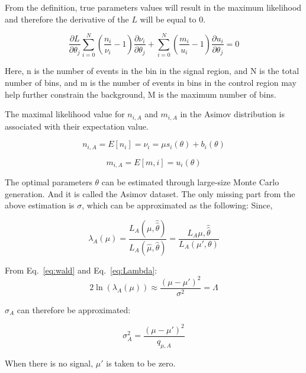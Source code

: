 From the definition, true parameters values will result in the maximum likelihood and therefore the derivative of the ${L}$ will be equal to 0. 

\begin{equation}
\frac{\partial{L}}{\partial{\theta_{j}}} \sum_{i=0}^{N}(\frac{n_{i}}{\nu_{i}}-1) \frac{\partial{\nu_{i}}}{\partial{\theta_{j}}}+ \sum_{i=0}^{N}(\frac{m_{i}}{u_{i}}-1) \frac{\partial{u_{i}}}{\partial{\theta_{j}}} =  0 
\end{equation}

Here, n is the number of events in the bin in the signal region, and N is the total number of bins, and m is the number of events in bins in the control region may help further constrain the background, M is the maximum number of bins. 

The maximal likelihood value for $n_{i,A}$ and $m_{i,A}$ in the Asimov distribution is associated with their expectation value. 

\begin{equation}
    n_{i,A} = E[n_{i}] = \nu_{i} = \mu s_{i}(\theta) + b_{i}(\theta)
\end{equation}

\begin{equation}
    m_{i,A} = E[m,i] = u_{i}(\theta)
\end{equation}

The optimal parameters $\theta$ can be estimated through large-size Monte Carlo generation. And it is called the Asimov dataset.
The only missing part from the above estimation is $\sigma$, which can be approximated as the following: 
Since, 

\begin{equation}
    \lambda_{A}(\mu) = \frac{L_{A}(\mu, \hat{\hat{\theta}})}{L_{A}(\hat{\mu}, \hat{\theta})}
= \frac{L_{A}{\mu, \hat{\hat{\theta}}}}{L_{A}(\mu', \theta)}
\end{equation}


From Eq.~\ref{eq:wald} and Eq.~\ref{eq:Lambda}:
\begin{equation}
2\ln(\lambda_{A}(\mu)) \approx \frac{(\mu-\mu')^{2}}{\sigma^{2}}=\Lambda
\end{equation}

$\sigma_{A}$ can therefore be approximated:

\begin{equation}
    \sigma_{A}^{2} = \frac{(\mu-\mu')^{2}}{q_{\mu,A}}
\end{equation}

When there is no signal, $\mu'$ is taken to be zero. 

